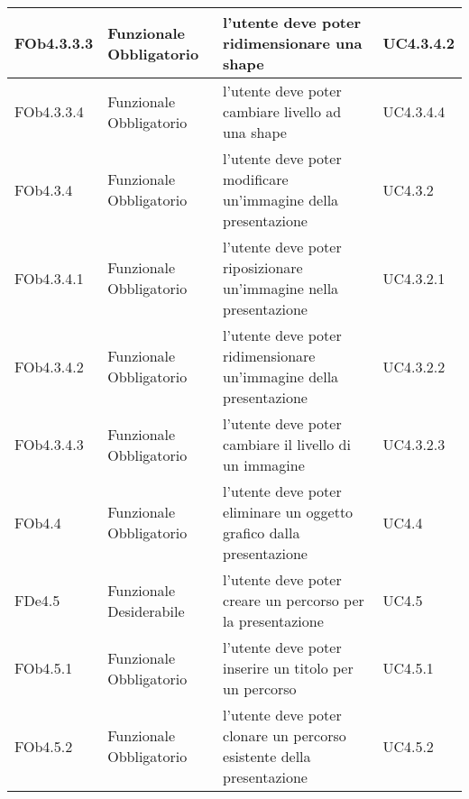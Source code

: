 \begin{longtable}{|l|p{2.5cm}|p{5cm}|p{3.5cm}|}
\hline
FOb4.3.3.3 & Funzionale \linebreak Obbligatorio & l'utente deve poter ridimensionare una shape & UC4.3.4.2 \linebreak  \\
\hline
FOb4.3.3.4 & Funzionale \linebreak Obbligatorio & l'utente deve poter cambiare livello ad una shape & UC4.3.4.4 \linebreak  \\
\hline
FOb4.3.4 & Funzionale \linebreak Obbligatorio & l'utente deve poter modificare un'immagine della presentazione & UC4.3.2 \linebreak  \\
\hline
FOb4.3.4.1 & Funzionale \linebreak Obbligatorio & l'utente deve poter riposizionare un'immagine nella presentazione & UC4.3.2.1 \linebreak  \\
\hline
FOb4.3.4.2 & Funzionale \linebreak Obbligatorio & l'utente deve poter ridimensionare un'immagine della presentazione & UC4.3.2.2 \linebreak  \\
\hline
FOb4.3.4.3 & Funzionale \linebreak Obbligatorio & l'utente deve poter cambiare il livello di un immagine & UC4.3.2.3 \linebreak  \\
\hline
FOb4.4 & Funzionale \linebreak Obbligatorio & l'utente deve poter eliminare un oggetto grafico dalla presentazione & UC4.4 \linebreak  \\
\hline
FDe4.5 & Funzionale \linebreak Desiderabile & l'utente deve poter creare un percorso per la presentazione & UC4.5 \linebreak  \\
\hline
FOb4.5.1 & Funzionale \linebreak Obbligatorio & l'utente deve poter inserire un titolo per un percorso & UC4.5.1 \linebreak  \\
\hline
FOb4.5.2 & Funzionale \linebreak Obbligatorio & l'utente deve poter clonare un percorso esistente della presentazione & UC4.5.2 \linebreak  \\

\end{longtable}

